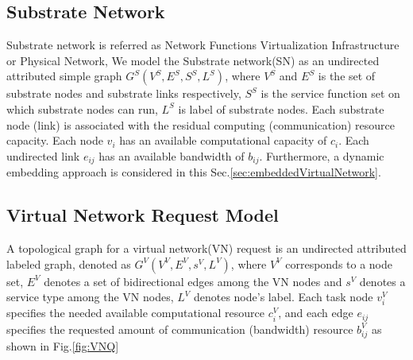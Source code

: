 



\subsection{Substrate Network}
Substrate network is referred as Network Functions Virtualization Infrastructure or Physical Network,  We model the Substrate network(SN) as an undirected attributed simple graph $G^S (V^S,E^S,S^S,L^S)$, where $V^S$ and $E^S$ is the set of substrate nodes and substrate links respectively, $S^S$ is the service function set on which substrate nodes can run, $L^S$ is label of substrate nodes. Each substrate node (link) is associated with the residual computing (communication) resource capacity. Each node $v_i$ has an available computational capacity of $c_i$. Each undirected link $e_{ij}$ has an available bandwidth of $b_{ij}$. Furthermore, a dynamic embedding approach is considered in this Sec.\ref{sec:embeddedVirtualNetwork}.

\subsection{Virtual Network Request Model}
A topological graph for a virtual network(VN) request is an undirected attributed labeled graph, denoted as $G^V (V^V,E^V,s^V,L^V)$, where $V^V$ corresponds to a node set, $E^V$ denotes a set of bidirectional edges among the VN nodes and $s^V$ denotes a service type among the VN nodes, $L^V$ denotes node's label. Each task node $v_i^V$ specifies the needed available computational resource $c_i^V$, and each edge $e_{ij}$ specifies the requested amount of communication (bandwidth) resource $b_{ij}^V$ as shown in Fig.\ref{fig:VNQ}


